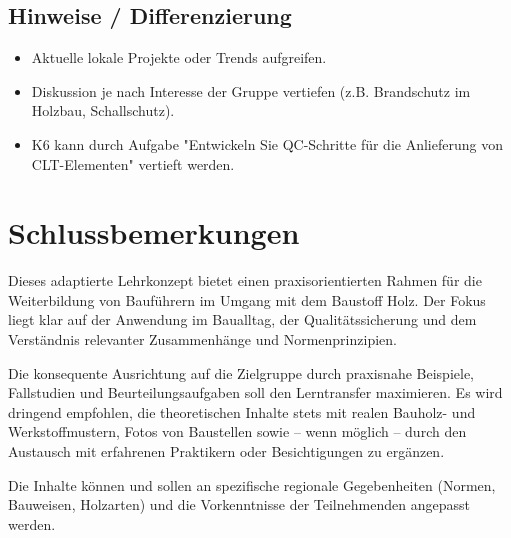 \documentclass[12pt, a4paper]{article}
\begin{document}
\subsection{Hinweise / Differenzierung}
\begin{itemize}
    \item Aktuelle lokale Projekte oder Trends aufgreifen.
    \item Diskussion je nach Interesse der Gruppe vertiefen (z.B. Brandschutz im Holzbau, Schallschutz).
    \item K6 kann durch Aufgabe "Entwickeln Sie QC-Schritte für die Anlieferung von CLT-Elementen" vertieft werden.
\end{itemize}

\newpage

\section{Schlussbemerkungen}

Dieses adaptierte Lehrkonzept bietet einen praxisorientierten Rahmen für die Weiterbildung von Bauführern im Umgang mit dem Baustoff Holz. Der Fokus liegt klar auf der Anwendung im Baualltag, der Qualitätssicherung und dem Verständnis relevanter Zusammenhänge und Normenprinzipien.

Die konsequente Ausrichtung auf die Zielgruppe durch praxisnahe Beispiele, Fallstudien und Beurteilungsaufgaben soll den Lerntransfer maximieren. Es wird dringend empfohlen, die theoretischen Inhalte stets mit realen Bauholz- und Werkstoffmustern, Fotos von Baustellen sowie – wenn möglich – durch den Austausch mit erfahrenen Praktikern oder Besichtigungen zu ergänzen.

Die Inhalte können und sollen an spezifische regionale Gegebenheiten (Normen, Bauweisen, Holzarten) und die Vorkenntnisse der Teilnehmenden angepasst werden.
\end{document}
